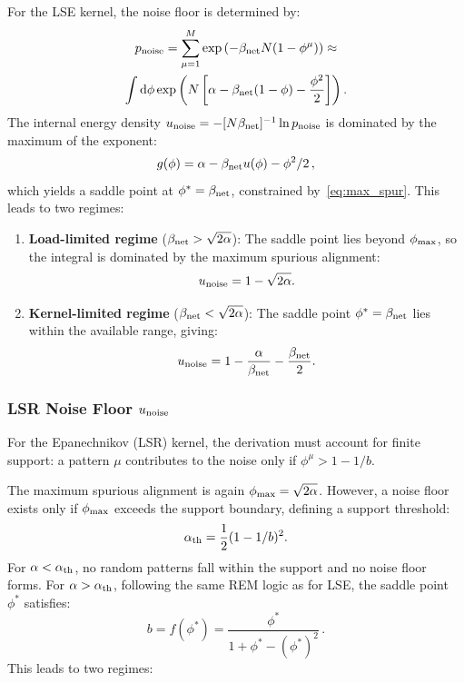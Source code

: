 \documentclass{article}
\newcommand{\dd}{{\mathrm{d}}}
\theoremstyle{plain}
\theoremstyle{definition}
\theoremstyle{remark}
\begin{document}
For the LSE kernel, the noise floor is determined by:
\begin{multline}
    p_{\rm noise} = \sum_{\mu=1}^{M} \exp\left( -\beta_{\rm net} N (1 - \phi^\mu) \right) \approx \\
    \int \dd\phi \exp\left( N \left[ \alpha - \beta_{\rm net}(1 - \phi) - \frac{\phi^2}{2} \right] \right).
\end{multline}
The internal energy density $u_{\rm noise} = -[N\beta_{\rm net}]^{-1} \ln p_{\rm noise}$ is dominated by the maximum of the exponent:
\begin{equation}
    g(\phi) = \alpha - \beta_{\rm net} u(\phi) - \phi^2/2\,,
    \label{eq:g_phi}
\end{equation}
which yields a saddle point at $\phi^* = \beta_{\rm net}$, constrained by~\eqref{eq:max_spur}. This leads to two regimes:

\begin{enumerate}
    \item \textbf{\textbf{Load-limited} regime} ($\beta_{\rm net} > \sqrt{2\alpha}$): The saddle point lies beyond $\phi_{\rm max}$, so the integral is dominated by the maximum spurious alignment:
    \begin{equation}
        u_{\rm noise} = 1 - \sqrt{2\alpha}.
    \end{equation}

    \item \textbf{\textbf{Kernel-limited} regime} ($\beta_{\rm net} < \sqrt{2\alpha}$): The saddle point $\phi^* = \beta_{\rm net}$ lies within the available range, giving:
    \begin{equation}
        u_{\rm noise} = 1 - \frac{\alpha}{\beta_{\rm net}} - \frac{\beta_{\rm net}}{2}.
    \end{equation}
\end{enumerate}


\subsubsection{LSR Noise Floor $u_{\rm noise}$}
For the Epanechnikov (LSR) kernel, the derivation must account for finite support: a pattern $\mu$ contributes to the noise only if $\phi^\mu > 1 - 1/b$.

The maximum spurious alignment is again $\phi_{\rm max} = \sqrt{2\alpha}$. However, a noise floor exists only if $\phi_{\rm max}$ exceeds the support boundary, defining a support threshold:
\begin{equation}
    \alpha_{\rm th} = \frac{1}{2} (1 - 1/b)^2 .
    \label{eq:alpha_th}
\end{equation}
For $\alpha < \alpha_{\rm th}$, no random patterns fall within the support and no noise floor forms. For $\alpha > \alpha_{\rm th}$, following the same REM logic as for LSE, the saddle point $\phi^*$ satisfies:
\begin{equation}
    b = f(\phi^*) = \frac{\phi^*}{1 + \phi^* - (\phi^*)^2}\,.
\end{equation}
This leads to two regimes:
\end{document}
